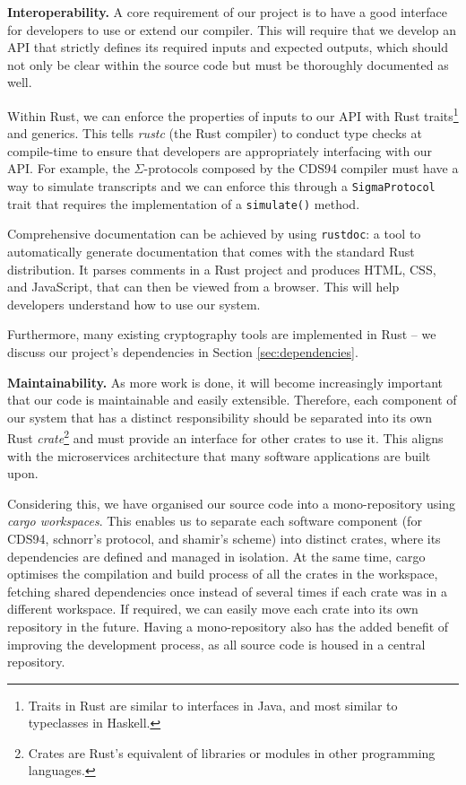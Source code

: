 \textbf{Interoperability.} A core requirement of our project is to have a good interface for developers to use or extend our compiler. This will require that we develop an API that strictly defines its required inputs and expected outputs, which should not only be clear within the source code but must be thoroughly documented as well.  

Within Rust, we can enforce the properties of inputs to our API with Rust traits\footnote{Traits in Rust are similar to interfaces in Java, and most similar to typeclasses in Haskell.} and generics. This tells \textit{rustc} (the Rust compiler) to conduct type checks at compile-time to ensure that developers are appropriately interfacing with our API. For example, the $\Sigma$-protocols composed by the CDS94 compiler must have a way to simulate transcripts and we can enforce this through a \texttt{SigmaProtocol} trait that requires the implementation of a \texttt{simulate()} method. 

Comprehensive documentation can be achieved by using \texttt{rustdoc}: a tool to automatically generate documentation that comes with the standard Rust distribution. It parses comments in a Rust project and produces HTML, CSS, and JavaScript, that can then be viewed from a browser. This will help developers understand how to use our system. 

Furthermore, many existing cryptography tools are implemented in Rust -- we discuss our project's dependencies in Section \ref{sec:dependencies}.

\textbf{Maintainability.} As more work is done, it will become increasingly important that our code is maintainable and easily extensible. Therefore, each component of our system that has a distinct responsibility should be separated into its own Rust \textit{crate}\footnote{Crates are Rust's equivalent of libraries or modules in other programming languages.} and must provide an interface for other crates to use it. This aligns with the microservices architecture that many software applications are built upon. 

Considering this, we have organised our source code into a mono-repository using \textit{cargo workspaces}. This enables us to separate each software component (for CDS94, schnorr's protocol, and shamir's scheme) into distinct crates, where its dependencies are defined and managed in isolation. At the same time, cargo optimises the compilation and build process of all the crates in the workspace, fetching shared dependencies once instead of several times if each crate was in a different workspace. If required, we can easily move each crate into its own repository in the future. Having a mono-repository also has the added benefit of improving the development process, as all source code is housed in a central repository. 

